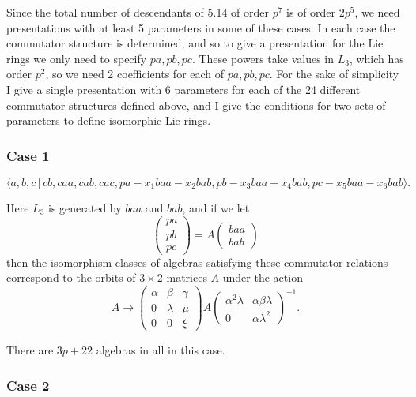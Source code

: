 \documentclass[10pt]{article}
\begin{document}
Since the total number of descendants of 5.14 of order $p^{7}$ is of order $%
2p^{5}$, we need presentations with at least 5 parameters in some of these
cases. In each case the commutator structure is determined, and so to give a
presentation for the Lie rings we only need to specify $pa,pb,pc$. These
powers take values in $L_{3}$, which has order $p^{2}$, so we need 2
coefficients for each of $pa,pb,pc$. For the sake of simplicity I give a
single presentation with 6 parameters for each of the 24 different
commutator structures defined above, and I give the conditions for two sets
of parameters to define isomorphic Lie rings.

\subsubsection{Case 1}

\begin{equation}
\langle
a,b,c\,|%
\,cb,caa,cab,cac,pa-x_{1}baa-x_{2}bab,pb-x_{3}baa-x_{4}bab,pc-x_{5}baa-x_{6}bab\rangle .
\tag{7.757}
\end{equation}

Here $L_{3}$ is generated by $baa$ and $bab$, and if we let 
\[
\left( 
\begin{array}{l}
pa \\ 
pb \\ 
pc%
\end{array}%
\right) =A\left( 
\begin{array}{l}
baa \\ 
bab%
\end{array}%
\right) 
\]%
then the isomorphism classes of algebras satisfying these commutator
relations correspond to the orbits of $3\times 2$ matrices $A$ under the
action 
\[
A\rightarrow \left( 
\begin{array}{lll}
\alpha & \beta & \gamma \\ 
0 & \lambda & \mu \\ 
0 & 0 & \xi%
\end{array}%
\right) A\left( 
\begin{array}{ll}
\alpha ^{2}\lambda & \alpha \beta \lambda \\ 
0 & \alpha \lambda ^{2}%
\end{array}%
\right) ^{-1}. 
\]%
$\allowbreak $

There are $3p+22$ algebras in all in this case.

\subsubsection{Case 2}
\end{document}
